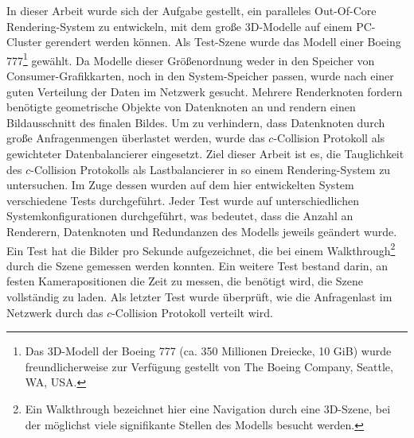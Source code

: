 In dieser Arbeit wurde sich der Aufgabe gestellt, ein paralleles Out-Of-Core Rendering-System zu entwickeln, mit dem große 3D-Modelle auf einem PC-Cluster gerendert werden können. Als Test-Szene wurde das Modell einer Boeing 777\footnote{Das 3D-Modell der Boeing 777 (ca. 350 Millionen Dreiecke, 10 GiB) wurde freundlicherweise zur Verfügung gestellt von The Boeing Company, Seattle, WA, USA.} gewählt. Da Modelle dieser Größenordnung weder in den Speicher von Consumer-Grafikkarten, noch in den System-Speicher passen, wurde nach einer guten Verteilung der Daten im Netzwerk gesucht. Mehrere Renderknoten fordern benötigte geometrische Objekte von Datenknoten an und rendern einen Bildausschnitt des finalen Bildes. Um zu verhindern, dass Datenknoten durch große Anfragenmengen überlastet werden, wurde das $c$-Collision Protokoll als gewichteter Datenbalancierer eingesetzt. Ziel dieser Arbeit ist es, die Tauglichkeit des $c$-Collision Protokolls als Lastbalancierer in so einem Rendering-System zu untersuchen. Im Zuge dessen wurden auf dem hier entwickelten System verschiedene Tests durchgeführt. Jeder Test wurde auf unterschiedlichen Systemkonfigurationen durchgeführt, was bedeutet, dass die Anzahl an Renderern, Datenknoten und Redundanzen des Modells jeweils geändert wurde. Ein Test hat die Bilder pro Sekunde aufgezeichnet, die bei einem Walkthrough\footnote{Ein Walkthrough bezeichnet hier eine Navigation durch eine 3D-Szene, bei der möglichst viele signifikante Stellen des Modells besucht werden.} durch die Szene gemessen werden konnten. Ein weitere Test bestand darin, an festen Kamerapositionen die Zeit zu messen, die benötigt wird, die Szene vollständig zu laden. Als letzter Test wurde überprüft, wie die Anfragenlast im Netzwerk durch das $c$-Collision Protokoll verteilt wird.

